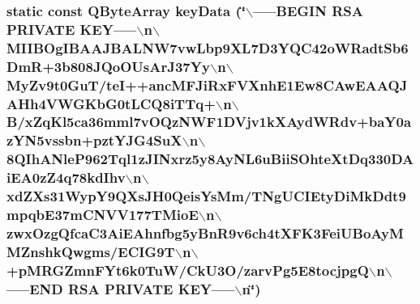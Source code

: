\subsubsection{\setlength{\rightskip}{0pt plus 5cm}static const QByteArray keyData (\char`\"{}$\backslash$-----BEGIN RSA PRIVATE KEY-----$\backslash$n$\backslash$MIIBOgIBAAJBALNW7vwLbp9XL7D3YQC42oWRadtSb6DmR+3b808JQoOUsArJ37Yy$\backslash$n$\backslash$MyZv9t0GuT/teI++ancMFJiRxFVXnhE1Ew8CAwEAAQJAHh4VWGKbG0tLCQ8iTTq+$\backslash$n$\backslash$B/xZqKl5ca36mml7vOQzNWF1DVjv1kXAydWRdv+baY0azYN5vssbn+pztYJG4SuX$\backslash$n$\backslash$8QIhANleP962Tql1zJINxrz5y8AyNL6uBiiSOhteXtDq330DAiEA0zZ4q78kdIhv$\backslash$n$\backslash$xdZXs31WypY9QXsJH0QeisYsMm/TNgUCIEtyDiMkDdt9mpqbE37mCNVV177TMioE$\backslash$n$\backslash$zwxOzgQfcaC3AiEAhnfbg5yBnR9v6ch4tXFK3FeiUBoAyMMZnshkQwgms/ECIG9T$\backslash$n$\backslash$+pMRGZmnFYt6k0TuW/CkU3O/zarvPg5E8tocjpgQ$\backslash$n$\backslash$-----END RSA PRIVATE KEY-----$\backslash$n\char`\"{})\hspace{0.3cm}{\tt  [static]}}\label{server_8cpp_7c41ac9360bb61fe961820ee4b53622b}


